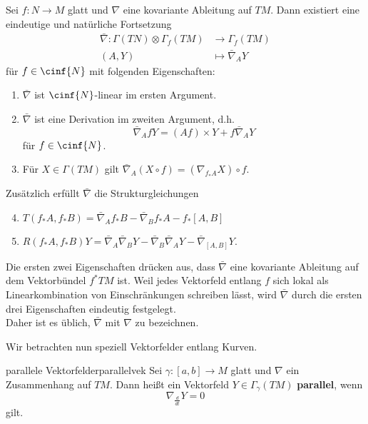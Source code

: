 \begin{satz}{}{}
Sei $f: N \to M$ glatt und $\nabla$ eine kovariante Ableitung auf $TM$. Dann existiert eine eindeutige und natürliche Fortsetzung
\begin{align}
\bar{\nabla}: \Gamma(TN) \otimes \Gamma_f(TM) &\to \Gamma_f(TM)\\
(A, Y) &\mapsto \bar{\nabla}_A Y
\end{align}
für $f \in \cinf{N}$ mit folgenden Eigenschaften:
\begin{enumerate}
\item $\bar{\nabla}$ ist $\cinf{N}$-linear im ersten Argument.
\item $\bar{\nabla}$ ist eine Derivation im zweiten Argument, d.h.
\begin{equation}
\bar{\nabla}_A fY = (Af) \times Y + f \bar{\nabla}_A Y
\end{equation}
für $f \in \cinf{N}$.
\item Für $X \in \Gamma(TM)$ gilt $\bar{\nabla}_A (X \circ f) = \left( \nabla_{f_\ast A} X\right) \circ f$.
\end{enumerate}
Zusätzlich erfüllt $\bar{\nabla}$ die Strukturgleichungen
\begin{enumerate}
\setcounter{enumi}{3}
\item $T(f_\ast A, f_\ast B) = \bar{\nabla}_A f_\ast B - \bar{\nabla}_B f_\ast A - f_\ast [A, B]$
\item $R(f_\ast A, f_\ast B)Y = \bar{\nabla}_A \bar{\nabla}_B Y - \bar{\nabla}_B \bar{\nabla}_A Y - \bar{\nabla}_{[A,B]} Y$.
\end{enumerate}
\end{satz}
\begin{bemerkung}
Die ersten zwei Eigenschaften drücken aus, dass $\bar{\nabla}$ eine kovariante Ableitung auf dem Vektorbündel $f^\ast TM$ ist. Weil jedes Vektorfeld entlang $f$ sich lokal als Linearkombination von Einschränkungen schreiben lässt, wird $\bar{\nabla}$ durch die ersten drei Eigenschaften eindeutig festgelegt.\\
Daher ist es üblich, $\bar{\nabla}$ mit $\nabla$ zu bezeichnen.
\end{bemerkung}
Wir betrachten nun speziell Vektorfelder entlang Kurven.
\begin{definition}{parallele Vektorfelder}{parallelvek}
Sei $\gamma: [a,b] \to M$ glatt und $\nabla$ ein Zusammenhang auf $TM$. Dann heißt ein Vektorfeld $Y \in \Gamma_\gamma (TM)$ \textbf{parallel}, wenn
\begin{equation}
\nabla_{\frac{d}{dt}} Y = 0
\end{equation}
gilt.
\end{definition}
